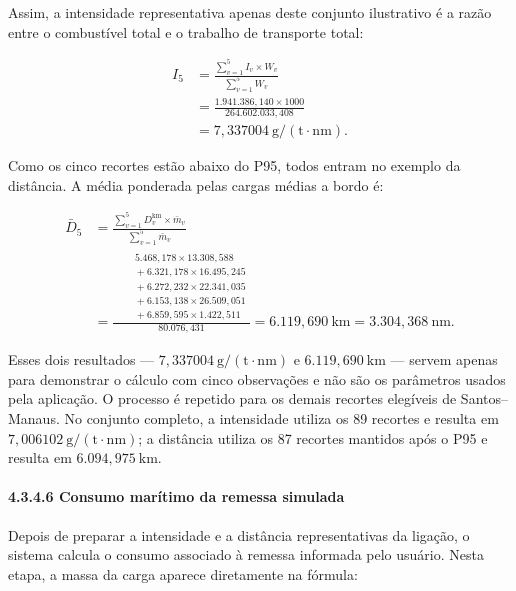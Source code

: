 \documentclass[brazil,]{article}
\let\oldparagraph\paragraph
\renewcommand{\paragraph}[1]{\Needspace{7\baselineskip}\oldparagraph{#1}\mbox{}}
\newcommand{\keepcalculation}{\Needspace{12\baselineskip}}
\begin{document}
Assim, a intensidade representativa apenas deste conjunto ilustrativo
é a razão entre o combustível total e o trabalho de transporte total:

\[
\begin{aligned}
I_5
&=\frac{\sum_{v=1}^{5}I_v\times W_v}{\sum_{v=1}^{5}W_v}\\[4pt]
&=\frac{1.941.386{,}140\times1000}{264.602.033{,}408}\\[4pt]
&=7{,}337004\ \mathrm{g/(t\cdot nm)}.
\end{aligned}
\]

\keepcalculation
Como os cinco recortes estão abaixo do P95, todos entram no exemplo da
distância. A média ponderada pelas cargas médias a bordo é:

\[
\begin{aligned}
\bar D_5
&=\frac{\sum_{v=1}^{5}D_v^{\mathrm{km}}\times\bar m_v}
{\sum_{v=1}^{5}\bar m_v}\\[4pt]
&=\frac{
\begin{aligned}
&\quad5.468{,}178\times13.308{,}588\\
&\quad+
6.321{,}178\times16.495{,}245\\
&\quad+
6.272{,}232\times22.341{,}035\\
&\quad+
6.153{,}138\times26.509{,}051\\
&\quad+
6.859{,}595\times1.422{,}511
\end{aligned}}
{80.076{,}431}
=6.119{,}690\ \mathrm{km}
=3.304{,}368\ \mathrm{nm}.
\end{aligned}
\]

Esses dois resultados --- \(7{,}337004\ \mathrm{g/(t\cdot nm)}\) e
\(6.119{,}690\ \mathrm{km}\) --- servem apenas para demonstrar o cálculo
com cinco observações e não são os parâmetros usados pela aplicação. O
processo é repetido para os demais recortes elegíveis de
Santos--Manaus. No conjunto completo, a intensidade utiliza os 89
recortes e resulta em \(7{,}006102\ \mathrm{g/(t\cdot nm)}\); a distância
utiliza os 87 recortes mantidos após o P95 e resulta em
\(6.094{,}975\ \mathrm{km}\).

\hypertarget{consumo-maruxedtimo-da-remessa-simulada}{%
\paragraph{4.3.4.6 Consumo marítimo da remessa
simulada}\label{consumo-maruxedtimo-da-remessa-simulada}}

Depois de preparar a intensidade e a distância representativas da
ligação, o sistema calcula o consumo associado à remessa informada pelo
usuário. Nesta etapa, a massa da carga aparece diretamente na fórmula:
\end{document}
